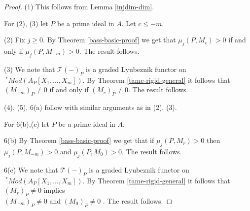 \documentclass{amsart}
\newcommand{\FF}{\mathcal{T}}
\theoremstyle{plain}
\theoremstyle{definition}
\theoremstyle{remark}
\begin{document}
\begin{proof}
(1) This follows from Lemma \ref{injdim-dim}.

For (2), (3) let $P$ be a prime ideal in $A$.  Let $c \leq -m$.

(2) Fix $j \geq 0$. By
Theorem \ref{bass-basic-proof} we get that $\mu_j(P, M_c)> 0$ if and only if 
$\mu_j(P, M_{-m})> 0$. The result follows.

(3) We note that $\FF(-)_P$ is a graded Lyubeznik functor on \\  $\ ^* Mod(A_P[X_1,\ldots, X_m])$. By Theorem \ref{tame-rigid-general} it follows that $(M_{-m})_P \neq 0$ if and only if $(M_c)_P \neq 0$. The result follows.

(4), (5), 6(a) follow with similar arguments as in (2), (3).

For 6(b),(c)
let $P$ be a prime ideal in $A$. 

6(b) By
Theorem \ref{bass-basic-proof} we get that if $\mu_j(P, M_r)> 0$ then 
$\mu_j(P, M_{-m})> 0$ and  $\mu_j(P, M_{0})> 0$. The result follows.

6(c) We note that $\FF(-)_P$ is a graded Lyubeznik functor on \\  $\ ^* Mod(A_P[X_1,\ldots, X_m])$. By Theorem \ref{tame-rigid-general} it follows that $(M_{r})_P \neq 0$  implies \\ $(M_{-m})_P \neq 0$ and $(M_{0})_P \neq 0$ . The result follows.
\end{proof}
\end{document}
